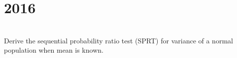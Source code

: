 \section*{2016}
\vspace{-.5cm}
\hrulefill \smallskip\\
 Derive the sequential probability ratio test (SPRT) for variance of a normal population when mean is known.